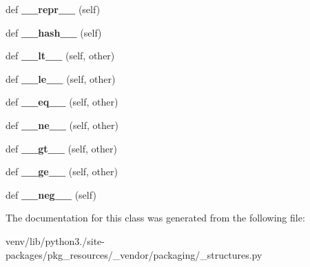 \begin{DoxyCompactItemize}
\item 
\mbox{\label{classpkg__resources_1_1__vendor_1_1packaging_1_1__structures_1_1_infinity_ad0a87780823a705083b3e4be8e41c723}} 
def {\bfseries \+\_\+\+\_\+repr\+\_\+\+\_\+} (self)
\item 
\mbox{\label{classpkg__resources_1_1__vendor_1_1packaging_1_1__structures_1_1_infinity_a784837820dd891327e01f97dce398fcc}} 
def {\bfseries \+\_\+\+\_\+hash\+\_\+\+\_\+} (self)
\item 
\mbox{\label{classpkg__resources_1_1__vendor_1_1packaging_1_1__structures_1_1_infinity_a36acf03515b9ea40539a9777a61e53fc}} 
def {\bfseries \+\_\+\+\_\+lt\+\_\+\+\_\+} (self, other)
\item 
\mbox{\label{classpkg__resources_1_1__vendor_1_1packaging_1_1__structures_1_1_infinity_ad0371120139e4d534bb4768e9cf93bff}} 
def {\bfseries \+\_\+\+\_\+le\+\_\+\+\_\+} (self, other)
\item 
\mbox{\label{classpkg__resources_1_1__vendor_1_1packaging_1_1__structures_1_1_infinity_acc68d773878376aa612e3bc0720f11e5}} 
def {\bfseries \+\_\+\+\_\+eq\+\_\+\+\_\+} (self, other)
\item 
\mbox{\label{classpkg__resources_1_1__vendor_1_1packaging_1_1__structures_1_1_infinity_a2cbf60d217fa5383e8252ebb3a5f9bf0}} 
def {\bfseries \+\_\+\+\_\+ne\+\_\+\+\_\+} (self, other)
\item 
\mbox{\label{classpkg__resources_1_1__vendor_1_1packaging_1_1__structures_1_1_infinity_ab82b97c3979d9d0b99fe62545bbd7ed1}} 
def {\bfseries \+\_\+\+\_\+gt\+\_\+\+\_\+} (self, other)
\item 
\mbox{\label{classpkg__resources_1_1__vendor_1_1packaging_1_1__structures_1_1_infinity_a1543d05acd42b4b04fa52cb9c8bd2da5}} 
def {\bfseries \+\_\+\+\_\+ge\+\_\+\+\_\+} (self, other)
\item 
\mbox{\label{classpkg__resources_1_1__vendor_1_1packaging_1_1__structures_1_1_infinity_ae1b3fb58136b675d74d937d9a36457d2}} 
def {\bfseries \+\_\+\+\_\+neg\+\_\+\+\_\+} (self)
\end{DoxyCompactItemize}


The documentation for this class was generated from the following file\+:\begin{DoxyCompactItemize}
\item 
venv/lib/python3./site-\/packages/pkg\+\_\+resources/\+\_\+vendor/packaging/\+\_\+structures.\+py\end{DoxyCompactItemize}
